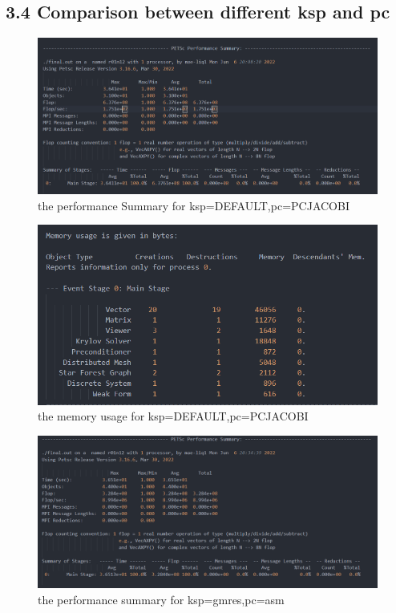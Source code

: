 \documentclass[12pt]{article}
\begin{document}
\subsection*{3.4 Comparison between different ksp and pc}


\begin{figure}
    \centering
    \includegraphics[scale=0.6]{img/ksp-default1.png}
    \caption{the performance Summary for ksp=DEFAULT,pc=PCJACOBI}
    \label{fig:ksp-default1}
\end{figure}

\begin{figure}
    \centering
    \includegraphics[scale=0.8]{img/ks-default2.png}
    \caption{the memory usage for ksp=DEFAULT,pc=PCJACOBI}
    \label{fig:ksp-default2}
\end{figure}

\begin{figure}
    \centering
    \includegraphics[scale=0.6]{img/ksp-germ1.png}
    \caption{the performance summary for ksp=gmres,pc=asm}
    \label{fig:ksp-gmres1}
\end{figure}
\end{document}

